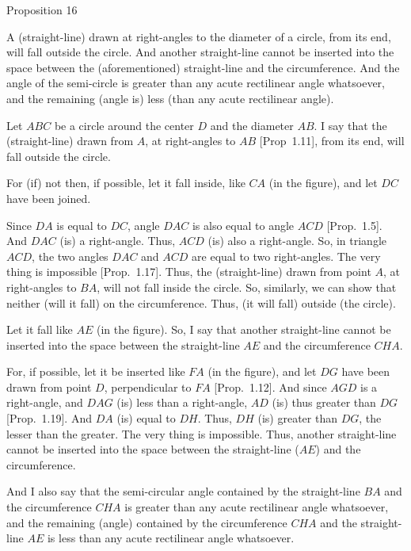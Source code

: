 
\begin{center}
{\large Proposition 16}
\end{center}

A (straight-line) drawn at right-angles to the diameter of a circle, from its
end, will fall outside the circle. And another straight-line cannot be inserted
into the space between the (aforementioned) straight-line and the circumference. And the
  angle of the semi-circle is greater than any acute rectilinear angle whatsoever, 
and the remaining (angle is) less (than any acute rectilinear angle).

Let $ABC$ be a circle around the center $D$ and the diameter $AB$. I say that
the (straight-line) drawn from $A$, at right-angles to $AB$ [Prop~1.11], from its end, will fall
outside the circle.

For (if) not then, if possible, let it fall inside, like $CA$ (in the figure), and let
$DC$ have been joined.

Since $DA$ is equal to $DC$, angle $DAC$ is also equal to angle $ACD$ [Prop.~1.5].
And $DAC$ (is) a right-angle. Thus, $ACD$ (is) also a right-angle. So, in triangle
$ACD$, the two angles $DAC$ and $ACD$ are equal to two right-angles. 
The very thing is
impossible [Prop.~1.17]. Thus, the (straight-line) drawn from point $A$,
at right-angles to $BA$, will not fall inside the circle. So, similarly, we can show 
that neither (will it fall) on the circumference. Thus, (it will fall) outside
(the circle).

\epsfysize=2in
\centerline{}

Let it fall like $AE$ (in the figure). So, I say that another straight-line cannot
be inserted into the space between the straight-line $AE$ and the
circumference $CHA$.

For, if possible, let it be inserted like $FA$ (in the figure), and let $DG$ have
been drawn from point $D$, perpendicular to $FA$ [Prop.~1.12]. And since $AGD$ is a right-angle, and
 $DAG$ (is) less than a right-angle, $AD$ (is) thus greater than $DG$  [Prop.~1.19]. And $DA$ (is) equal to $DH$. Thus, $DH$ (is)
greater than $DG$, the lesser than the greater. The very thing is impossible.
Thus, another straight-line cannot be inserted into the space between the
straight-line ($AE$) and the circumference.

And I also say that the  semi-circular angle  contained by the straight-line
$BA$ and the circumference $CHA$ is greater than any acute rectilinear angle whatsoever,
and the remaining (angle) contained by the circumference $CHA$ and the straight-line
$AE$ is less than any acute rectilinear angle whatsoever.

